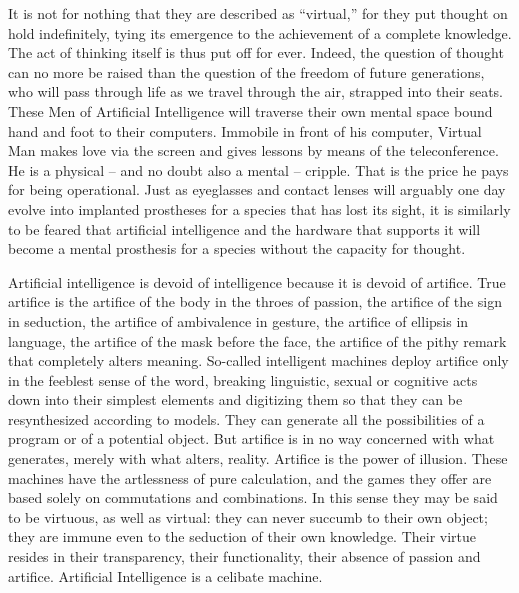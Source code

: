 \documentclass[10pt,twoside,openright]{memoir}
\begin{document}
It is not for nothing that they are described as ``virtual,'' for they put thought on hold indefinitely, tying its emergence to the achievement of a complete knowledge. The act of thinking itself is thus put off for ever. Indeed, the question of thought can no more be raised than the question of the freedom of future generations, who will pass through life as we travel through the air, strapped into their seats. These Men of Artificial Intelligence will traverse their own mental space bound hand and foot to their computers. Immobile in front of his computer, Virtual Man makes love via the screen and gives lessons by means of the teleconference. He is a physical -- and no doubt also a mental -- cripple. That is the price he pays for being operational. Just as eyeglasses and contact lenses will arguably one day evolve into implanted prostheses for a species that has lost its sight, it is similarly to be feared that artificial intelligence and the hardware that supports it will become a mental prosthesis for a species without the capacity for thought.

Artificial intelligence is devoid of intelligence because it is devoid of artifice. True artifice is the artifice of the body in the throes of passion, the artifice of the sign in seduction, the artifice of ambivalence in gesture, the artifice of ellipsis in language, the artifice of the mask before the face, the artifice of the pithy remark that completely alters meaning. So-called intelligent machines deploy artifice only in the feeblest sense of the word, breaking linguistic, sexual or cognitive acts down into their simplest elements and digitizing them so that they can be resynthesized according to models. They can generate all the possibilities of a program or of a potential object. But artifice is in no way concerned with what generates, merely with what alters, reality. Artifice is the power of illusion. These machines have the artlessness of pure calculation, and the games they offer are based solely on commutations and combinations. In this sense they may be said to be virtuous, as well as virtual: they can never succumb to their own object; they are immune even to the seduction of their own knowledge. Their virtue resides in their transparency, their functionality, their absence of passion and artifice. Artificial Intelligence is a celibate machine. 
\end{document}

